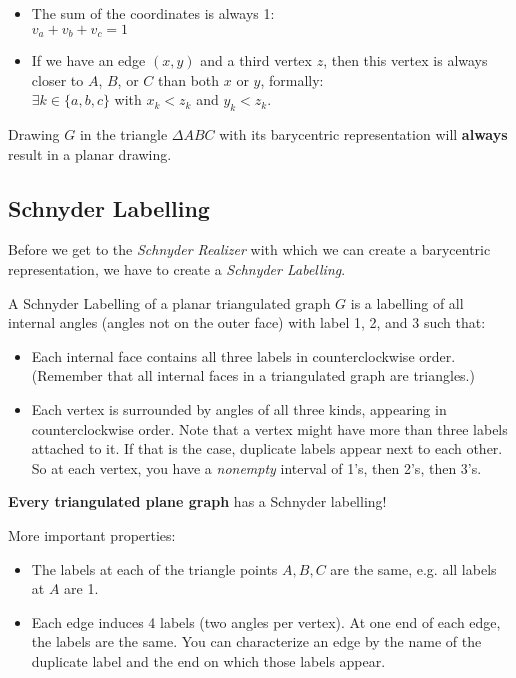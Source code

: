 \documentclass[10pt,a4paper]{article}
\begin{document}
\begin{itemize}
    \item The sum of the coordinates is always 1:\\
        $v_a + v_b + v_c = 1$
    \item If we have an edge $(x, y)$ and a third vertex $z$, then this vertex
        is always closer to $A$, $B$, or $C$ than both $x$ or $y$, formally:\\
        $\exists k \in \{a, b, c\}$ with $x_k < z_k$ and $y_k < z_k$.
\end{itemize}

Drawing $G$ in the triangle $\Delta A B C$ with its barycentric representation
will \textbf{always} result in a planar drawing.

\subsection{Schnyder Labelling}
Before we get to the \textit{Schnyder Realizer} with which we can create a
barycentric representation, we have to create a \textit{Schnyder Labelling}.

A Schnyder Labelling of a planar triangulated graph $G$ is a labelling of all
internal angles (angles not on the outer face) with label 1, 2, and 3 such
that:
\begin{itemize}
    \item Each internal face contains all three labels in counterclockwise
        order.
        (Remember that all internal faces in a triangulated graph are
        triangles.)
    \item Each vertex is surrounded by angles of all three kinds, appearing in
        counterclockwise order.
        Note that a vertex might have more than three labels attached to it.
        If that is the case, duplicate labels appear next to each other.
        So at each vertex, you have a \textit{nonempty} interval of 1's, then
        2's, then 3's.
\end{itemize}

\textbf{Every triangulated plane graph} has a Schnyder labelling!

More important properties:
\begin{itemize}
    \item The labels at each of the triangle points $A, B, C$ are the same,
        e.g. all labels at $A$ are 1.
    \item Each edge induces 4 labels (two angles per vertex).
        At one end of each edge, the labels are the same.
        You can characterize an edge by the name of the duplicate label and the
        end on which those labels appear.
\end{itemize}
\end{document}
